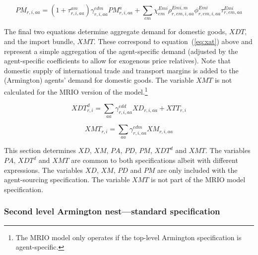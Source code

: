 \documentclass[11pt,letterpaper]{report}
\begin{document}
\begin{equation}
\label{eq:pm}
\mathit{PM}_{r,i,aa} =
   \left( 1 + \tau^{\mathit{am}}_{r,i,\mathit{aa}} \right)
   \gamma^{\mathit{edm}}_{r,i,\mathit{aa}} \mathit{PM}^a_{r,i,\mathit{aa}}
+  \sum_{\mathit{em}} {
      \chi^{\mathit{Emi}}_{\mathit{em}}
      \rho^{\mathit{Emi},m}_{r,\mathit{em},i,\mathit{aa}}
      \phi^{\mathit{Emi}}_{r,\mathit{em},i,\mathit{aa}}
      \tau^{\mathit{Emi}}_{r,\mathit{em},\mathit{aa}}
   }
\end{equation}

The final two equations determine aggregate demand for domestic goods,
$\mathit{XDT}$, and the import bundle, $\mathit{XMT}$. These correspond to
equation~(\ref{eq:xat}) above and represent a simple aggregation of the
agent-specific demand (adjusted by the agent-specific coefficients to allow for
exogenous price relatives). Note that domestic supply of international trade and
transport margins is added to the (Armington) agents' demand for domestic goods.
The variable $\mathit{XMT}$ is not calculated for the MRIO version of the
model.\footnote{The MRIO model only operates if the top-level Armington
specification is agent-specific.}

\begin{equation}
\label{eq:xdta}
\mathit{XDT}^d_{r,i} =
   \sum_{\mathit{aa}} {
      \gamma^{\mathit{edd}}_{r,i,\mathit{aa}} \mathit{XD}_{r,i,\mathit{aa}}
   }
+  \mathit{XTT}_{r,i}
\end{equation}

\begin{equation}
\label{eq:xmta}
\mathit{XMT}_{r,i} =
   \sum_{\mathit{aa}} {
      \gamma^{\mathit{edm}}_{r,i,\mathit{aa}} \mathit{XM}_{r,i,\mathit{aa}}
   }
\end{equation}

\noindent This section determines $\mathit{XD}$, $\mathit{XM}$, $\mathit{PA}$,
$\mathit{PD}$, $\mathit{PM}$, $\mathit{XDT^d}$ and $\mathit{XMT}$. The variables
$\mathit{PA}$, $\mathit{XDT}^d$ and $\mathit{XMT}$ are common to both
specifications albeit with different expressions. The variables $\mathit{XD}$,
$\mathit{XM}$, $\mathit{PD}$ and $\mathit{PM}$ are only included with the
agent-sourcing specification. The variable $\mathit{XMT}$ is not part of the
MRIO model specification.

\subsubsection{Second level Armington nest---standard specification}
\end{document}
